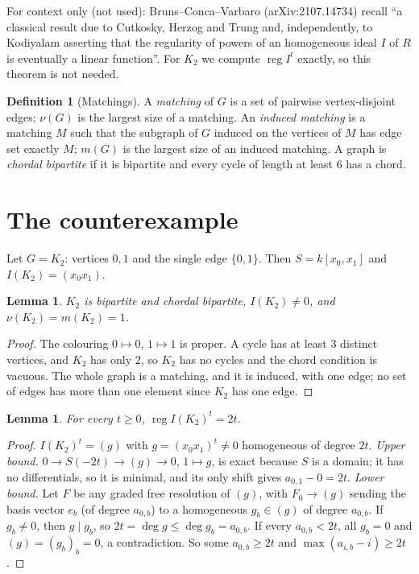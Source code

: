 \documentclass[11pt]{article}
\newtheorem{lemma}[theorem]{Lemma}
\theoremstyle{definition}
\newtheorem{definition}[theorem]{Definition}
\theoremstyle{remark}
\renewcommand{\_}{\oldus\allowbreak}
\newcommand{\reg}{\operatorname{reg}}
\begin{document}
For context only (not used): Bruns--Conca--Varbaro (arXiv:2107.14734) recall ``a classical result due to
Cutkosky, Herzog and Trung and, independently, to Kodiyalam asserting that the regularity of powers of an
homogeneous ideal $I$ of $R$ is eventually a linear function''. For $K_2$ we compute $\reg I^t$ exactly,
so this theorem is not needed.

\begin{definition}[Matchings]
A \emph{matching} of $G$ is a set of pairwise vertex-disjoint edges; $\nu(G)$ is the largest size of a
matching. An \emph{induced matching} is a matching $M$ such that the subgraph of $G$ induced on the
vertices of $M$ has edge set exactly $M$; $m(G)$ is the largest size of an induced matching.
A graph is \emph{chordal bipartite} if it is bipartite and every cycle of length at least $6$ has a chord.
\end{definition}

\section{The counterexample}

Let $G = K_2$: vertices $0,1$ and the single edge $\{0,1\}$. Then $S = k[x_0,x_1]$ and $I(K_2) = (x_0x_1)$.

\begin{lemma}\label{lem:graph}
$K_2$ is bipartite and chordal bipartite, $I(K_2) \ne 0$, and $\nu(K_2) = m(K_2) = 1$.
\end{lemma}
\begin{proof}
The colouring $0 \mapsto 0$, $1 \mapsto 1$ is proper. A cycle has at least $3$ distinct vertices, and
$K_2$ has only $2$, so $K_2$ has no cycles and the chord condition is vacuous. The whole graph is a
matching, and it is induced, with one edge; no set of edges has more than one element since $K_2$ has
one edge.
\end{proof}

\begin{lemma}\label{lem:reg}
For every $t \ge 0$, $\reg I(K_2)^t = 2t$.
\end{lemma}
\begin{proof}
$I(K_2)^t = (g)$ with $g = (x_0x_1)^t \ne 0$ homogeneous of degree $2t$.
\emph{Upper bound.} $0 \to S(-2t) \to (g) \to 0$, $1 \mapsto g$, is exact because $S$ is a domain; it
has no differentials, so it is minimal, and its only shift gives $a_{0,1} - 0 = 2t$.
\emph{Lower bound.} Let $F$ be any graded free resolution of $(g)$, with $F_0 \to (g)$ sending the basis
vector $e_b$ (of degree $a_{0,b}$) to a homogeneous $g_b \in (g)$ of degree $a_{0,b}$. If $g_b \ne 0$,
then $g \mid g_b$, so $2t = \deg g \le \deg g_b = a_{0,b}$. If every $a_{0,b} < 2t$, all $g_b = 0$ and
$(g) = (g_b)_b = 0$, a contradiction. So some $a_{0,b} \ge 2t$ and $\max(a_{i,b} - i) \ge 2t$.
\end{proof}
\end{document}
